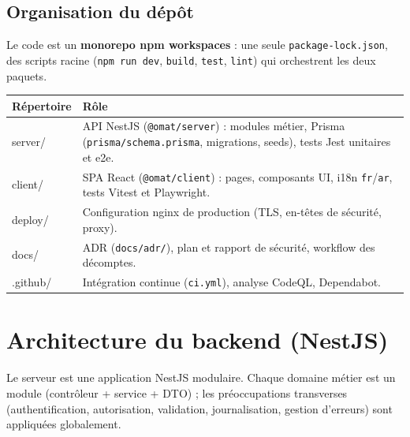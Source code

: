\documentclass[10.5pt,a4paper]{article}
\newcommand{\code}[1]{\texttt{\small #1}}
\begin{document}
\subsection{Organisation du dépôt}
Le code est un \textbf{monorepo npm workspaces} : une seule \code{package-lock.json}, des scripts
racine (\code{npm run dev}, \code{build}, \code{test}, \code{lint}) qui orchestrent les deux paquets.

\begin{tabularx}{\textwidth}{@{}>{\ttfamily\small}l X@{}}
\toprule
\normalfont\bfseries Répertoire & \bfseries Rôle \\
\midrule
server/ & API NestJS (\code{@omat/server}) : modules métier, Prisma (\code{prisma/schema.prisma}, migrations, seeds), tests Jest unitaires et e2e. \\
client/ & SPA React (\code{@omat/client}) : pages, composants UI, i18n \code{fr}/\code{ar}, tests Vitest et Playwright. \\
deploy/ & Configuration nginx de production (TLS, en-têtes de sécurité, proxy). \\
docs/ & ADR (\code{docs/adr/}), plan et rapport de sécurité, workflow des décomptes. \\
.github/ & Intégration continue (\code{ci.yml}), analyse CodeQL, Dependabot. \\
\bottomrule
\end{tabularx}

\section{Architecture du backend (NestJS)}

Le serveur est une application NestJS modulaire. Chaque domaine métier est un module
(contrôleur + service + DTO) ; les préoccupations transverses (authentification, autorisation,
validation, journalisation, gestion d'erreurs) sont appliquées globalement.
\end{document}
